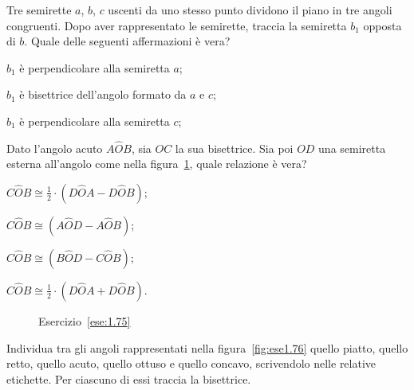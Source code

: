 \begin{esercizio}
\label{ese:1.74}
Tre semirette $a$, $b$, $c$ uscenti da uno stesso punto dividono il 
piano in tre angoli congruenti. Dopo aver rappresentato le semirette, 
traccia la semiretta $b_1$ opposta di $b$. Quale delle seguenti 
affermazioni è vera?
\begin{enumeratea}
\item $b_1$ è perpendicolare alla semiretta $a$;
\item $b_1$ è bisettrice dell'angolo formato da $a$ e $c$;
\item $b_1$ è perpendicolare alla semiretta $c$;
\end{enumeratea}
\end{esercizio}

\begin{esercizio}
\label{ese:1.75}
Dato l'angolo acuto $A\widehat{O}B$, sia $OC$ la sua bisettrice. Sia 
poi $OD$ una semiretta esterna all'angolo come nella 
figura~\ref{fig:ese1.75}, quale relazione è vera?
\begin{multicols}{2}
\begin{enumeratea}
\item $C\widehat{O}B\cong 
\frac{1}{2}\cdot(D\widehat{O}A-D\widehat{O}B)$;
\item $C\widehat{O}B\cong (A\widehat{O}D-A\widehat{O}B)$;
\item $C\widehat{O}B\cong (B\widehat{O}D-C\widehat{O}B)$;
\item $C\widehat{O}B\cong 
\frac{1}{2}\cdot(D\widehat{O}A+D\widehat{O}B)$.
\end{enumeratea}
\end{multicols}
\end{esercizio}


\begin{inaccessibleblock}
 \begin{figure}[htb]
 \centering
 \caption{Esercizio~\ref{ese:1.75}}\label{fig:ese1.75}
\end{figure}
\end{inaccessibleblock}

\begin{esercizio}
\label{ese:1.76}
Individua tra gli angoli rappresentati nella figura~\ref{fig:ese1.76} 
quello piatto, quello retto, quello acuto, quello ottuso e quello 
concavo, scrivendolo nelle relative etichette. Per ciascuno di essi 
traccia la bisettrice.
\end{esercizio}


